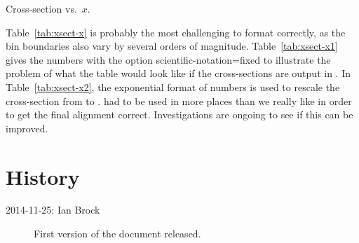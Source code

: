 \documentclass[UKenglish,texlive=2016]{\ATLASLATEXPATH atlasdoc}
\begin{document}
\begin{table}[htb]
  \centering
  \renewcommand{\arraystretch}{1.4}
  \caption{Cross-section vs.\ $x$.}
  \label{tab:xsect-x}
\end{table}

Table~\ref{tab:xsect-x} is probably the most challenging to format
correctly, as the bin boundaries also vary by several orders of
magnitude. Table~\ref{tab:xsect-x1} gives the numbers with the option
\textsf{scientific-notation=fixed} to illustrate the problem of what
the table would look like if the cross-sections are output in
\si{\pb}.  In Table~\ref{tab:xsect-x2}, the exponential format of
numbers is used to rescale the cross-section from \si{\pb} to
\si{\nb}.   had to be used in more places than we
really like in order to get the final alignment
correct. Investigations are ongoing to see if this can be improved.

\section*{History}

\begin{description}
\item[2014-11-25: Ian Brock] First version of the document released.
\end{description}

\printbibliography
% 
% 
\end{document}
